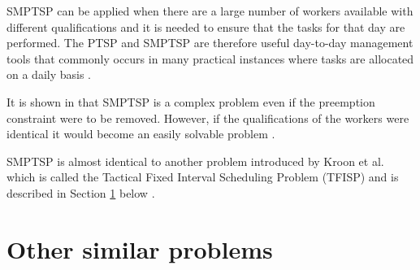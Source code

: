 SMPTSP can be applied when there are a large number of workers available with different qualifications and it is needed to ensure that the tasks for that day are performed. The PTSP and SMPTSP are therefore useful day-to-day management tools that commonly occurs in many practical instances where tasks are allocated on a daily basis \cite{krishnamoorthy_2011}.

It is shown in \cite{kroon_1997} that SMPTSP is a complex problem even if the preemption constraint were to be removed. However, if the qualifications of the workers were identical it would become an easily solvable problem \cite{krishnamoorthy_2011}.

SMPTSP is almost identical to another problem introduced by Kroon et al. which is called the Tactical Fixed Interval Scheduling Problem (TFISP) and is described in Section \ref{other} below \cite{krishnamoorthy_2011}.




 

%
%
%
%

\section{Other similar problems}\label{other}

